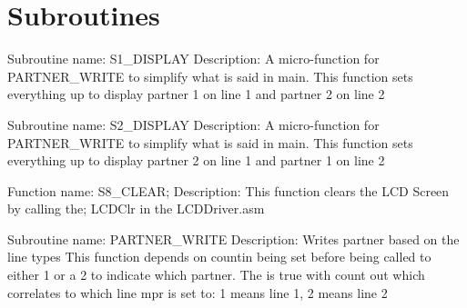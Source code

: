 \documentclass[12pt, letterpaper]{article}
\begin{document}

\section{Subroutines}

 Subroutine name:	S1\_DISPLAY \newline
 Description:	A micro-function for PARTNER\_WRITE to simplify what is said in main. This function sets everything up to display partner 1 on line 1 and partner 2 on line 2

 Subroutine name: S2\_DISPLAY \newline
 Description: A micro-function for PARTNER\_WRITE to simplify what is said in main. This function sets everything up to display partner 2 on line 1 and partner 1 on line 2

Function name: S8\_CLEAR; \newline
Description: This function clears the LCD Screen by calling the; LCDClr in the LCDDriver.asm

Subroutine name: PARTNER\_WRITE \newline
Description: Writes partner based on the line types This function depends on countin being set before being called to either 1 or a 2 to indicate which partner. The is true with count out which correlates to which line mpr is set to: 1 means line 1, 2 means line 2



\end{document}
